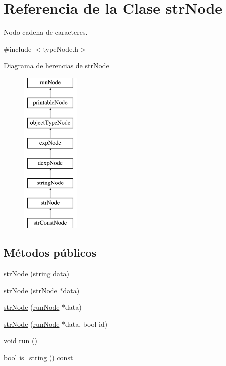 \hypertarget{classstrNode}{\section{Referencia de la Clase str\-Node}
\label{classstrNode}
}


Nodo cadena de caracteres.  




{\ttfamily \#include $<$type\-Node.\-h$>$}

Diagrama de herencias de str\-Node\begin{figure}[H]
\begin{center}
\leavevmode
\includegraphics[height=8.000000cm]{classstrNode}
\end{center}
\end{figure}
\subsection*{Métodos públicos}
\begin{DoxyCompactItemize}
\item 
\hyperlink{classstrNode_a11257986dbd5ef6f7baad026546bdcfb}{str\-Node} (string data)
\item 
\hyperlink{classstrNode_acde7257189f1d0b71122b55c3271f87e}{str\-Node} (\hyperlink{classstrNode}{str\-Node} $\ast$data)
\item 
\hyperlink{classstrNode_a4e4f3dcb4165f922152122eb771a4d10}{str\-Node} (\hyperlink{classrunNode}{run\-Node} $\ast$data)
\item 
\hyperlink{classstrNode_aa35b5fed0c69d59fe39041007b022f20}{str\-Node} (\hyperlink{classrunNode}{run\-Node} $\ast$data, bool id)
\item 
void \hyperlink{classstrNode_af11bd0e4f2dff849f90528f01220b811}{run} ()
\item 
bool \hyperlink{classstrNode_a8c20866d5b62df101233be5bc11a28a7}{is\-\_\-string} () const 
\end{DoxyCompactItemize}
